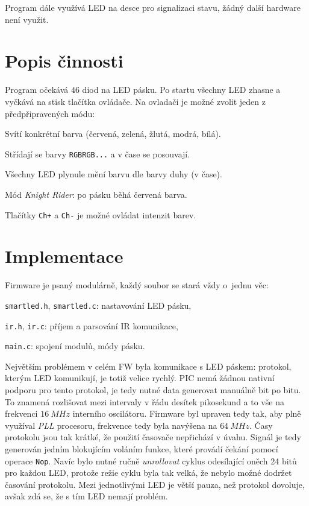 \documentclass[12pt,a4paper]{article}
\begin{document}
Program dále využívá LED na desce pro signalizaci stavu, žádný další hardware
není využit.

\section{Popis činnosti}

Program očekává $46$ diod na LED pásku. Po startu všechny LED zhasne a vyčkává
na stisk tlačítka ovládače. Na ovladači je možné zvolit jeden z předpřipravených
módu:

\begin{compactenum}
\item Svítí konkrétní barva (červená, zelená, žlutá, modrá, bílá).
\item Střídají se barvy \texttt{RGBRGB...} a v čase se posouvají.
\item Všechny LED plynule mění barvu dle barvy duhy (v čase).
\item Mód \textit{Knight Rider}: po pásku běhá červená barva.
\end{compactenum}

Tlačítky \texttt{Ch+} a \texttt{Ch-} je možné ovládat intenzit barev.

\section{Implementace}

Firmware je psaný modulárně, každý soubor se stará vždy o~jednu věc:
\begin{compactitem}
	\item \texttt{smartled.h}, \texttt{smartled.c}: nastavování LED pásku,
	\item \texttt{ir.h}, \texttt{ir.c}: příjem a parsování IR komunikace,
	\item \texttt{main.c}: spojení modulů, módy pásku.
\end{compactitem}

Největším problémem v celém FW byla komunikace s LED páskem: protokol, kterým
LED komunikují, je totiž velice rychlý. PIC nemá žádnou nativní podporu pro
tento protokol, je tedy nutné data generovat manuálně bit po bitu. To znamená
rozlišovat mezi intervaly v řádu desítek pikosekund a to vše na frekvenci $16\
MHz$ interního oscilátoru. Firmware byl upraven tedy tak, aby plně využíval
\textit{PLL} procesoru, frekvence tedy byla navýšena na $64\ MHz$. Časy
protokolu jsou tak krátké, že použití časovače nepřichází v úvahu. Signál je
tedy generován jedním blokujícím voláním funkce, které provádí čekání pomocí
operace \texttt{Nop}.  Navíc bylo nutné ručně \textit{unrollovat} cyklus
odesílající oněch 24 bitů pro každou LED, protože režie cyklu byla tak velká,
že nebylo možné dodržet časování protokolu. Mezi jednotlivými LED je větší
pauza, než protokol dovoluje, avšak zdá se, že s tím LED nemají problém.
\end{document}
